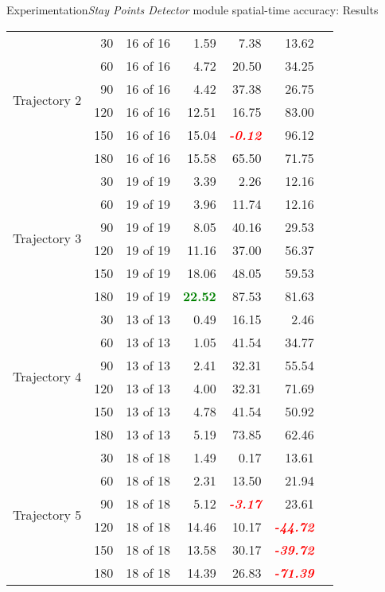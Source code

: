 \begin{frame}{Experimentation}{\emph{Stay Points Detector} module spatial-time accuracy: Results}
\begin{table}
{\begin{tabular}{@{}lrrrrrr@{}}
\multirow{6}{*}{Trajectory 2} 
 & 30 & 16 of 16 & 1.59 & 7.38 & 13.62 \\
 & 60 & 16 of 16 & 4.72 & 20.50 & 34.25 \\
 & 90 & 16 of 16 & 4.42 & 37.38 & 26.75 \\
 & 120 & 16 of 16 & 12.51 & 16.75 & 83.00 \\
 & 150 & 16 of 16 & 15.04 & \textcolor{red}{\textbf{\emph{-0.12}}} & 96.12 \\
 & 180 & 16 of 16 & 15.58 & 65.50 & 71.75 \\
 \cmidrule(l){1-6}

\multirow{6}{*}{Trajectory 3} 
 & 30 & 19 of 19 & 3.39 &  2.26 & 12.16 \\
 & 60 & 19 of 19 & 3.96 &  11.74 & 12.16 \\
 & 90 & 19 of 19 & 8.05 &  40.16 & 29.53 \\
 & 120 & 19 of 19 & 11.16  & 37.00 & 56.37 \\
 & 150 & 19 of 19 & 18.06  & 48.05 & 59.53 \\
 & 180 & 19 of 19 & \textcolor{green}{\textbf{22.52}} & 87.53 & 81.63 \\
 \cmidrule(l){1-6}

\multirow{6}{*}{Trajectory 4} 
 & 30 & 13 of 13 & 0.49 &  16.15 & 2.46 \\
 & 60 & 13 of 13 & 1.05 &  41.54 & 34.77 \\
 & 90 & 13 of 13 & 2.41 &  32.31 & 55.54 \\
 & 120 & 13 of 13 & 4.00 & 32.31 & 71.69 \\
 & 150 & 13 of 13 & 4.78 & 41.54 & 50.92 \\
 & 180 & 13 of 13 & 5.19 & 73.85 & 62.46 \\
 \cmidrule(l){1-6}

\multirow{6}{*}{Trajectory 5} 
 & 30 & 18 of 18 & 1.49 & 0.17 & 13.61 \\
 & 60 & 18 of 18 & 2.31 & 13.50 & 21.94 \\
 & 90 & 18 of 18 & 5.12 & \textcolor{red}{\textbf{\emph{-3.17}}} & 23.61 \\
 & 120 & 18 of 18 & 14.46 & 10.17 & \textcolor{red}{\textbf{\emph{-44.72}}} \\
 & 150 & 18 of 18 & 13.58 & 30.17 & \textcolor{red}{\textbf{\emph{-39.72}}} \\
 & 180 & 18 of 18 & 14.39 & 26.83 & \textcolor{red}{\textbf{\emph{-71.39}}} \\
 \cmidrule(l){1-6}


\end{tabular}}
\end{table}
\end{frame}
